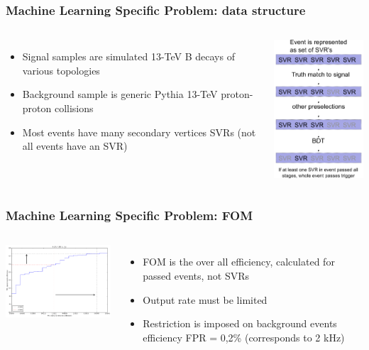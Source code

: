 \documentclass[xcolor=svgnames]{beamer}
\begin{document}
\begin{frame}\frametitle{Machine Learning Specific Problem: data structure}
\begin{columns}
\column{3in}
\begin{itemize}
	\item Signal samples are simulated 13-TeV B decays of various topologies
	\item Background sample is generic Pythia 13-TeV proton-proton collisions
	\item Most events have many secondary vertices SVRs (not all events have an SVR)
\end{itemize}
\column{2in}
\includegraphics[width=1.9in]{images/triggers-svg.png}
\end{columns}
\end{frame}



\begin{frame}\frametitle{Machine Learning Specific Problem: FOM}
\begin{columns}
\column{3in}
\hspace*{0.2cm}\includegraphics[width=2.8in]{images/roc_events.png}
\column{2in}
\begin{itemize}
	\item FOM is the over all efficiency, calculated for passed events, not SVRs
	\item Output rate must be limited
	\item Restriction is imposed on background events efficiency FPR = 0,2\% (corresponds to 2 kHz)
\end{itemize}
\end{columns}
\end{frame}
\end{document}
